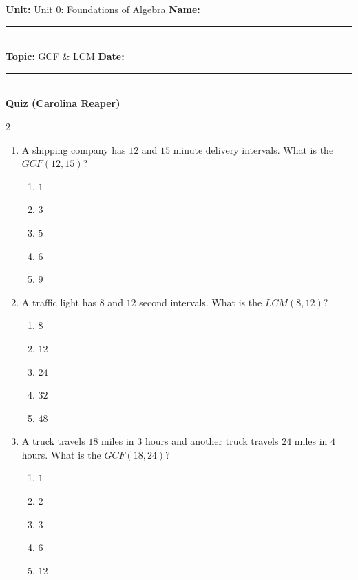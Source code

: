 \documentclass[10pt]{article}
\begin{document}
\enlargethispage{2.5cm}

\begin{tcolorbox}[colback=mainblue!5, colframe=mainblue, sharp corners, boxrule=0.5pt]
    \small \textbf{Unit:} Unit 0: Foundations of Algebra \hfill \textbf{Name:} \rule{3cm}{0.4pt} \\
    \small \textbf{Topic:} GCF & LCM \hfill \textbf{Date:} \rule{2cm}{0.4pt} \\
    \centering \textbf{\large Quiz (Carolina Reaper)}
\end{tcolorbox}

\vspace{0.2cm}

\begin{multicols}{2}
\begin{enumerate}[label=\textbf{Q\arabic*.}, leftmargin=*, itemsep=6pt, parsep=0pt]

  \item \small A shipping company has $12$ and $15$ minute delivery intervals. What is the $GCF(12, 15)$?
  \begin{enumerate}[label=(\Alph*), leftmargin=0.6cm, nosep, itemsep=2pt]
    \item $1$
    \item $3$
    \item $5$
    \item $6$
    \item $9$
  \end{enumerate}

  \item \small A traffic light has $8$ and $12$ second intervals. What is the $LCM(8, 12)$?
  \begin{enumerate}[label=(\Alph*), leftmargin=0.6cm, nosep, itemsep=2pt]
    \item $8$
    \item $12$
    \item $24$
    \item $32$
    \item $48$
  \end{enumerate}

  \item \small A truck travels $18$ miles in $3$ hours and another truck travels $24$ miles in $4$ hours. What is the $GCF(18, 24)$?
  \begin{enumerate}[label=(\Alph*), leftmargin=0.6cm, nosep, itemsep=2pt]
    \item $1$
    \item $2$
    \item $3$
    \item $6$
    \item $12$
  \end{enumerate}


\end{enumerate}
\end{multicols}
\end{document}
